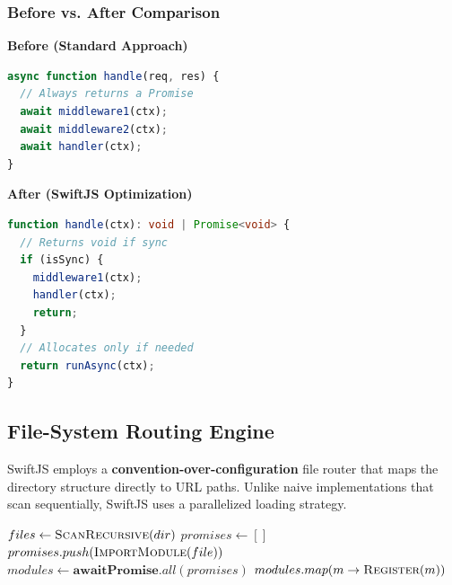 \documentclass[11pt, a4paper]{article}
\begin{document}
\subsubsection{Before vs. After Comparison}

\begin{minipage}{0.48\textwidth}
\textbf{Before (Standard Approach)}
\begin{lstlisting}[language=JavaScript]
async function handle(req, res) {
  // Always returns a Promise
  await middleware1(ctx);
  await middleware2(ctx);
  await handler(ctx); 
}
\end{lstlisting}
\end{minipage}
\hfill
\begin{minipage}{0.48\textwidth}
\textbf{After (SwiftJS Optimization)}
\begin{lstlisting}[language=TypeScript]
function handle(ctx): void | Promise<void> {
  // Returns void if sync
  if (isSync) {
    middleware1(ctx);
    handler(ctx);
    return; 
  }
  // Allocates only if needed
  return runAsync(ctx);
}
\end{lstlisting}
\end{minipage}

\subsection{File-System Routing Engine}
SwiftJS employs a \textbf{convention-over-configuration} file router that maps the directory structure directly to URL paths. Unlike naive implementations that scan sequentially, SwiftJS uses a parallelized loading strategy.

\begin{algorithm}[H]
\caption{Parallel Route Loading}\label{alg:fs-routing}
\begin{algorithmic}[1]
    \State $files \gets \Call{ScanRecursive}{dir}$
    \State $promises \gets []$
            \State $promises.push(\Call{ImportModule}{file})$
        \EndIf
    \EndFor
    \State {}
    \State $modules \gets \textbf{await} \textbf{Promise}.all(promises)$
    \State \Return $modules.map(m \to \Call{Register}{m})$
\EndFunction
\end{algorithmic}
\end{algorithm}
\end{document}
